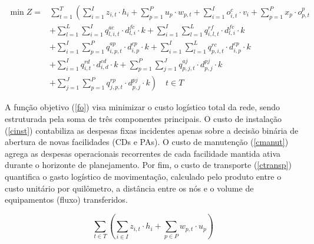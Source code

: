
\begin{equation}\label{fo}
\begin{aligned}
\min Z = & \sum_{t=1}^{T} \left( \sum_{i=1}^{I} z_{i,t} \cdot h_{i} + \sum_{p=1}^{P} u_{p} \cdot w_{p,t} + \sum_{i=1}^{I} o^{c}_{i,t} \cdot v_{i} + \sum_{p=1}^{P} x_{p} \cdot o^{p}_{p,t} \right.\\
& + \sum_{l=1}^{L}\sum_{i=1}^{I} q^{ac}_{l,i,t} \cdot d^{fc}_{l,i} \cdot k + \sum_{i=1}^{I}\sum_{l=1}^{L} q^{rf}_{i,l,t} \cdot d^{fc}_{l,i} \cdot k \\
& + \sum_{i=1}^{I}\sum_{p=1}^{P} q^{ap}_{i,p,t} \cdot d^{cp}_{i,p} \cdot k + \sum_{i=1}^{I}\sum_{l=1}^{L} q^{rc}_{p,i,t} \cdot d^{cp}_{i,p} \cdot k \\
& + \sum_{i=1}^{I}q^{rd}_{i,t} \cdot d^{cd}_{i,d} \cdot k + \sum_{p=1}^{P}\sum_{j=1}^{J} q^{aj}_{p,j,t} \cdot d^{pj}_{p,j} \cdot k \\
& \left. + \sum_{j=1}^{J}\sum_{p=1}^{P} q^{rp}_{j,p,t} \cdot d^{pj}_{p,j} \cdot k \right) \quad t \in T
\end{aligned}
\end{equation} 


A função objetivo (\ref{fo}) visa minimizar o custo logístico total da rede, sendo estruturada pela soma de três componentes principais. O custo de instalação (\ref{cinst}) contabiliza as despesas fixas incidentes apenas sobre a decisão binária de abertura de novas facilidades (CDs e PAs). O custo de manutenção (\ref{cmanut}) agrega as despesas operacionais recorrentes de cada facilidade mantida ativa durante o horizonte de planejamento. Por fim, o custo de transporte (\ref{ctransp}) quantifica o gasto logístico de movimentação, calculado pelo produto entre o custo unitário por quilômetro, a distância entre os nós e o volume de equipamentos (fluxo) transferidos.

\begin{equation}\label{cinst}
\sum_{t \in T} \left( \sum_{i \in I} z_{i,t} \cdot h_{i} + \sum_{p \in P} w_{p,t} \cdot u_{p} \right)
\end{equation}

